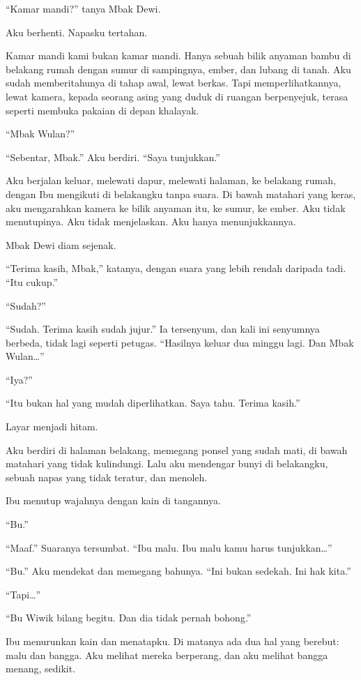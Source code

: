 \documentclass[11pt,twoside,openany]{book}
\begin{document}
``Kamar mandi?'' tanya Mbak Dewi.

Aku berhenti. Napasku tertahan.

Kamar mandi kami bukan kamar mandi. Hanya sebuah bilik anyaman bambu di belakang rumah dengan sumur di sampingnya, ember, dan lubang di tanah. Aku sudah memberitahunya di tahap awal, lewat berkas. Tapi memperlihatkannya, lewat kamera, kepada seorang asing yang duduk di ruangan berpenyejuk, terasa seperti membuka pakaian di depan khalayak.

``Mbak Wulan?''

``Sebentar, Mbak.'' Aku berdiri. ``Saya tunjukkan.''

Aku berjalan keluar, melewati dapur, melewati halaman, ke belakang rumah, dengan Ibu mengikuti di belakangku tanpa suara. Di bawah matahari yang keras, aku mengarahkan kamera ke bilik anyaman itu, ke sumur, ke ember. Aku tidak menutupinya. Aku tidak menjelaskan. Aku hanya menunjukkannya.

Mbak Dewi diam sejenak.

``Terima kasih, Mbak,'' katanya, dengan suara yang lebih rendah daripada tadi. ``Itu cukup.''

``Sudah?''

``Sudah. Terima kasih sudah jujur.'' Ia tersenyum, dan kali ini senyumnya berbeda, tidak lagi seperti petugas. ``Hasilnya keluar dua minggu lagi. Dan Mbak Wulan\ldots{}''

``Iya?''

``Itu bukan hal yang mudah diperlihatkan. Saya tahu. Terima kasih.''

Layar menjadi hitam.

Aku berdiri di halaman belakang, memegang ponsel yang sudah mati, di bawah matahari yang tidak kulindungi. Lalu aku mendengar bunyi di belakangku, sebuah napas yang tidak teratur, dan menoleh.

Ibu menutup wajahnya dengan kain di tangannya.

``Bu.''

``Maaf.'' Suaranya tersumbat. ``Ibu malu. Ibu malu kamu harus tunjukkan\ldots{}''

``Bu.'' Aku mendekat dan memegang bahunya. ``Ini bukan sedekah. Ini hak kita.''

``Tapi\ldots{}''

``Bu Wiwik bilang begitu. Dan dia tidak pernah bohong.''

Ibu menurunkan kain dan menatapku. Di matanya ada dua hal yang berebut: malu dan bangga. Aku melihat mereka berperang, dan aku melihat bangga menang, sedikit.
\end{document}
